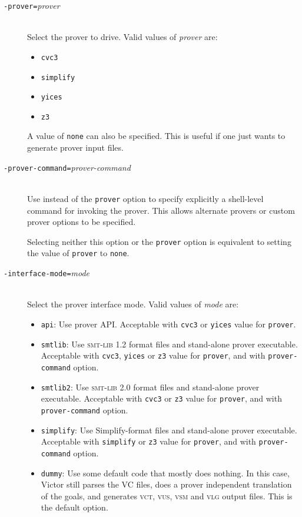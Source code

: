 \documentclass[12pt,fleqn]{article}
\newcommand{\smtlib}{\textsc{smt-lib}}
\newcommand{\logfile}{\textsc{vlg}}
\newcommand{\goalreportfile}{\textsc{vct}}
\newcommand{\unitsumfile}{\textsc{vus}}
\newcommand{\sessionsumfile}{\textsc{vsm}}
\newcommand{\optionv}[2]{\item[\texttt{-{#1}=}\mdseries\textit{#2}]\ \\}
\begin{document}
\begin{description}
\optionv{prover}{prover}
  Select the prover to drive.  Valid values of \emph{prover} are:
  \begin{itemize}
  \item \texttt{cvc3}
  \item \texttt{simplify}
  \item \texttt{yices}
  \item \texttt{z3}
  \end{itemize}
  A value of \texttt{none} can also be specified.  This is useful if
  one just wants to generate prover input files.

\optionv{prover-command}{prover-command}
  Use instead of the \texttt{prover} option to specify explicitly a
  shell-level command for invoking the prover.  This allows alternate
  provers or custom prover options to be specified.

  Selecting neither this option or the \texttt{prover} option is
  equivalent to setting the value of \texttt{prover} to \texttt{none}.
  
\optionv{interface-mode}{mode}
  Select the prover interface mode.  Valid values of \emph{mode} are:
  \begin{itemize}
  \item \texttt{api}: Use prover API.  
    Acceptable with \texttt{cvc3} or \texttt{yices}
    value for \texttt{prover}.

  \item \texttt{smtlib}: Use \smtlib{} 1.2 format files and
     stand-alone prover executable.
    Acceptable with \texttt{cvc3}, \texttt{yices} or \texttt{z3}
    value for \texttt{prover},
    and with \texttt{prover-command} option.

  \item \texttt{smtlib2}: Use \smtlib{} 2.0 format files and
     stand-alone prover executable.
    Acceptable with \texttt{cvc3} or \texttt{z3}
    value for \texttt{prover},
    and with \texttt{prover-command} option.

  \item \texttt{simplify}: Use Simplify-format files and
     stand-alone prover executable. 
    Acceptable with \texttt{simplify} or \texttt{z3} value for
    \texttt{prover}, 
    and with \texttt{prover-command} option.

  \item \texttt{dummy}: 
    Use some default code that mostly does nothing.  In this case,
    Victor still parses the VC files, does a prover independent
    translation of the goals, and generates \goalreportfile{}, \unitsumfile{},
    \sessionsumfile{} and \logfile{} output files.  This is the default option. 
  \end{itemize}

\end{description}
\end{document}
